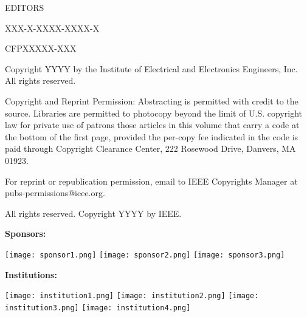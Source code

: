 \documentclass[letterpaper,oneside]{book}
\begin{document}
 EDITORS

 XXX-X-XXXX-XXXX-X

 CFPXXXXX-XXX


\vspace{0.5cm}

\noindent Copyright \textcopyright YYYY by the Institute of Electrical and Electronics Engineers, Inc. All rights reserved.

\noindent Copyright and Reprint Permission: Abstracting is permitted with credit to the source. Libraries are permitted to photocopy beyond
the limit of U.S. copyright law for private use of patrons those articles in this volume that carry a code at the bottom of the first page,
provided the per-copy fee indicated in the code is paid through Copyright Clearance Center, 222 Rosewood Drive, Danvers, MA
01923. 

\noindent For reprint or republication permission, email to IEEE Copyrights Manager at pubs-permissions@ieee.org. 

\noindent All rights reserved. Copyright \textcopyright YYYY by IEEE.

\vspace{1.5cm}

{\Large \bfseries Sponsors:}

\vspace{-0.3cm}
\texttt{[image: sponsor1.png]}
\hspace{0.8cm}
\texttt{[image: sponsor2.png]}
\hspace{0.8cm}
\texttt{[image: sponsor3.png]}
\null\vspace{0.7cm}

{\Large \bfseries Institutions:}

\vspace{0.2cm}
\texttt{[image: institution1.png]}
\hspace{0.8cm}
\texttt{[image: institution2.png]}
\hspace{0.8cm}
\texttt{[image: institution3.png]}
\hspace{0.8cm}
\texttt{[image: institution4.png]}
\end{document}
